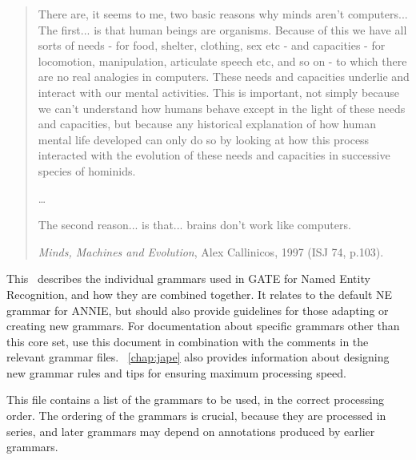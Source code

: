 %
%
%
%



\begin{quote}
There are, it seems to me, two basic reasons why minds aren't computers...
The first... is that human beings are organisms. Because
of this we have all sorts of needs - for food, shelter, clothing, sex
etc - and capacities - for locomotion, manipulation, articulate
speech etc, and so on - to which there are no real analogies in computers.
These needs and capacities underlie and interact with our
mental activities. This is important, not simply because we can't
understand how humans behave except in the light of these needs
and capacities, but because any historical explanation of how human
mental life developed can only do so by looking at how this
process interacted with the evolution of these needs and capacities
in successive species of hominids. 

\ldots

The second reason... is that... brains don't work like computers. 

{\it Minds, Machines and Evolution}, Alex Callinicos, 1997 (ISJ 74, p.103).
\end{quote}


This \chapthing\ describes the individual grammars used in GATE for Named
Entity Recognition, and how they are combined together. It relates to
the default NE grammar for ANNIE, but should also provide guidelines
for those adapting or creating new grammars. For documentation about
specific grammars other than this core set, use this document in
combination with the comments in the relevant grammar
files. \chapthing\ \ref{chap:jape} also provides information
about designing new grammar rules and tips for ensuring maximum
processing speed.



This file contains a list of the grammars to be used, in the
correct processing order. The ordering of the grammars is crucial,
because they are processed in series, and later grammars may depend on
annotations produced by earlier grammars.

